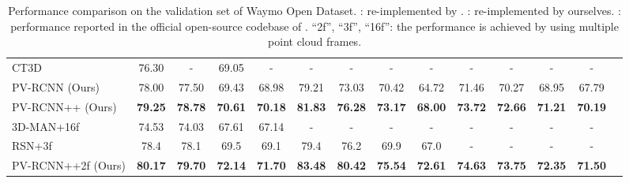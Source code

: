 \documentclass[natbib,twocolumn]{svjour3}          \smartqed  \usepackage{graphicx}
\begin{document}
\begin{table*}
\begin{center}
{\begin{tabular}{l||cc|cc|cc|cc|cc|ccl}
				CT3D~\citep{sheng2021} & 76.30 & - & 69.05 & - & - & - & - & -& - & - & - & -  \\
				PV-RCNN (Ours) & 78.00 & 77.50 &	69.43 & 68.98 & 79.21 & 73.03 & 70.42 & 64.72	& 71.46 & 70.27 & 68.95 & 67.79\\
				PV-RCNN++ (Ours)  & \textbf{79.25} & \textbf{78.78} & 	\textbf{70.61} & \textbf{70.18} & \textbf{81.83} & \textbf{76.28} & \textbf{73.17} & \textbf{68.00} & \textbf{73.72} & \textbf{72.66} & \textbf{71.21} & \textbf{70.19} \\ 
				\hline
				3D-MAN+16f~\citep{yang20213d} & 74.53 & 74.03 & 67.61 & 67.14 & - & - & - & -& - & - & - & - \\
				RSN+3f~\citep{sun2021rsn} & 78.4 & 78.1 & 69.5 & 69.1 & 79.4 & 76.2 &  69.9 & 67.0 & - & - & - & - \\
				PV-RCNN++2f (Ours) & \textbf{80.17} & \textbf{79.70} & \textbf{72.14} & \textbf{71.70} & \textbf{83.48} & \textbf{80.42} & 	\textbf{75.54} & \textbf{72.61} & \textbf{74.63} & \textbf{73.75} & \textbf{72.35} & \textbf{71.50}\\
				\hline
		\end{tabular}}
	\end{center}
    \vspace{-3mm}
	\caption{Performance comparison on the validation set of Waymo Open Dataset. 
		: re-implemented by \citep{zhou2020end}. 
		: re-implemented by ourselves. 
		: performance reported in the official open-source codebase of \citep{yin2021center}.
		``2f'', ``3f'', ``16f'': the performance is achieved by using multiple point cloud frames. 
	}
	\label{tab:waymo_val}
	\vspace{-2mm}
\end{table*} 
\end{document}
